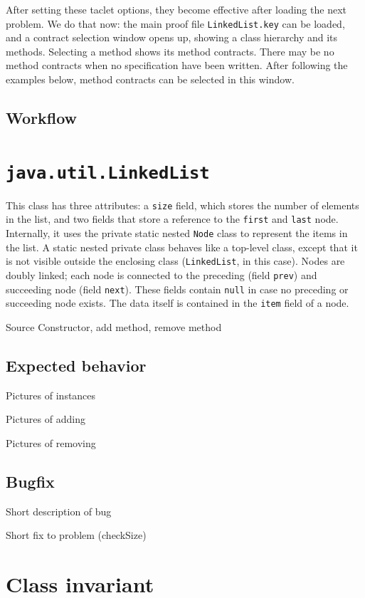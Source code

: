 \documentclass[runningheads]{llncs}
\begin{document}
After setting these taclet options, they become effective after loading the next problem. We do that now: the main proof file \texttt{LinkedList.key} can be loaded, and a contract selection window opens up, showing a class hierarchy and its methods. Selecting a method shows its method contracts. There may be no method contracts when no specification have been written. After following the examples below, method contracts can be selected in this window.

\subsection{Workflow}


\section{\texttt{java.util.LinkedList}}\label{sec:linkedlist}

This class has three attributes: a \texttt{size} field, which stores the number of elements in the list, and two
fields that store a reference to the \texttt{first} and \texttt{last} node. Internally, it uses the private static nested \texttt{Node} class to represent the items in the list. A static nested private class behaves like a top-level class, except that it is not visible outside the enclosing class (\texttt{LinkedList}, in this case). Nodes are doubly linked; each node is connected to the preceding (field \texttt{prev}) and succeeding node (field \texttt{next}). These fields contain \texttt{null} in case no preceding or succeeding node exists. The data itself is contained in the \texttt{item} field of a node.

Source
Constructor, add method, remove method

\subsection{Expected behavior}
Pictures of instances

Pictures of adding

Pictures of removing

\subsection{Bugfix}
Short description of bug

Short fix to problem (checkSize)

\section{Class invariant}\label{sec:class-invariant}
\end{document}
